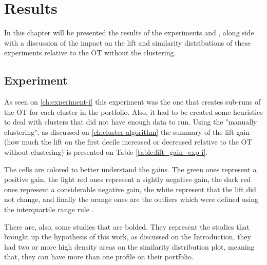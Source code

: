 \chapter{Results}

In this chapter will be presented the results of the experiments \nameExperimentI{} and \nameExperimentII{}, along side with a discussion of the impact on the lift and similarity distributions of these experiments relative to the OT without the clustering.

\section{Experiment \nameExperimentI}

As seen on \ref{ch:experiment-i} this experiment was the one that creates sub-runs of the OT for each cluster in the portfolio. Also, it had to be created some heuristics to deal with clusters that did not have enough data to run. Using the "manually clustering", as discussed on \ref{ch:cluster-algorithm} the summary of the lift gain (how much the lift on the first decile increased or decreased relative to the OT without clustering) is presented on Table \ref{table:lift_gain_exp-i}. 

The cells are colored to better understand the gains. The green ones represent a positive gain, the light red ones represent a sightly negative gain, the dark red ones represent a considerable negative gain, the white represent that the lift did not change, and finally the orange ones are the outliers which were defined using the interquartile range rule \cite{upton1996understanding}. 

There are, also, some studies that are bolded. They represent the studies that brought up the hypothesis of this work, as discussed on the Introduction, they had two or more high density areas on the similarity distribution plot, meaning that, they can have more than one profile on their portfolio.

